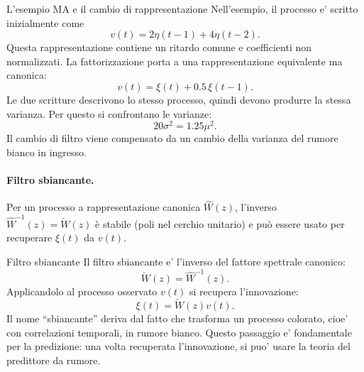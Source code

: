 \documentclass[11pt,a4paper]{article}
\begin{document}
\begin{spiegazione}{L'esempio MA e il cambio di rappresentazione}
Nell'esempio, il processo e' scritto inizialmente come
\[
v(t)=2\eta(t-1)+4\eta(t-2).
\]
Questa rappresentazione contiene un ritardo comune e coefficienti non normalizzati. La fattorizzazione porta a una rappresentazione equivalente ma canonica:
\[
v(t)=\xi(t)+0.5\,\xi(t-1).
\]
Le due scritture descrivono lo stesso processo, quindi devono produrre la stessa varianza. Per questo si confrontano le varianze:
\[
20\sigma^2=1.25\mu^2.
\]
Il cambio di filtro viene compensato da un cambio della varianza del rumore bianco in ingresso.
\end{spiegazione}

\paragraph{Filtro sbiancante.} Per un processo a rappresentazione canonica $\hat W(z)$, l'inverso $\hat W^{-1}(z) = \check W(z)$ è stabile (poli nel cerchio unitario) e può essere usato per recuperare $\xi(t)$ da $v(t)$. 

\begin{center}
\end{center}

\begin{center}
\end{center}

\begin{spiegazione}{Filtro sbiancante}
Il filtro sbiancante e' l'inverso del fattore spettrale canonico:
\[
\check W(z)=\hat W^{-1}(z).
\]
Applicandolo al processo osservato $v(t)$ si recupera l'innovazione:
\[
\xi(t)=\check W(z)v(t).
\]
Il nome ``sbiancante'' deriva dal fatto che trasforma un processo colorato, cioe' con correlazioni temporali, in rumore bianco. Questo passaggio e' fondamentale per la predizione: una volta recuperata l'innovazione, si puo' usare la teoria del predittore da rumore.
\end{spiegazione}
\end{document}
